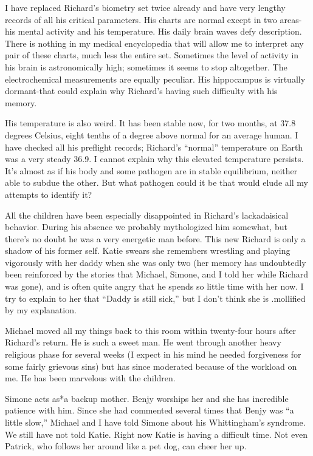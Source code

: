 \documentclass[]{article}
\begin{document}
{I have replaced Richard’s biometry set twice already and have very lengthy records of all his critical parameters. His charts are normal except in two areas-his mental activity and his temperature. His daily brain waves defy description. There is nothing in my medical encyclopedia that will allow me to interpret any pair of these charts, much less the entire set. Sometimes the level of activity in his brain is astronomically high; sometimes it seems to stop altogether. The electrochemical measurements are equally peculiar. His hippocampus is virtually dormant-that could explain why Richard’s having such difficulty with his memory.

His temperature is also weird. It has been stable now, for two months, at 37.8 degrees Celsius, eight tenths of a degree above normal for an average human. I have checked all his preflight records; Richard’s “normal” temperature on Earth was a very steady 36.9. I cannot explain why this elevated temperature persists. It’s almost as if his body and some pathogen are in stable equilibrium, neither able to subdue the other. But what pathogen could it be that would elude all my attempts to identify it?

All the children have been especially disappointed in Richard’s lackadaisical behavior. During his absence we probably mythologized him somewhat, but there’s no doubt he was a very energetic man before. This new Richard is only a shadow of his former self. Katie swears she remembers wrestling and playing vigorously with her daddy when she was only two (her memory has undoubtedly been reinforced by the stories that Michael, Simone, and I told her while Richard was gone), and is often quite angry that he spends so little time with her now. I try to explain to her that “Daddy is still sick,” but I don’t think she is .mollified by my explanation.

Michael moved all my things back to this room within twenty-four hours after Richard’s return. He is such a sweet man. He went through another heavy religious phase for several weeks (I expect in his mind he needed forgiveness for some fairly grievous sins) but has since moderated because of the workload on me. He has been marvelous with the children.

Simone acts as*a backup mother. Benjy worships her and she has incredible patience with him. Since she had commented several times that Benjy was “a little slow,” Michael and I have told Simone about his Whittingham’s syndrome. We still have not told Katie. Right now Katie is having a difficult time. Not even Patrick, who follows her around like a pet dog, can cheer her up.

}
\end{document}
